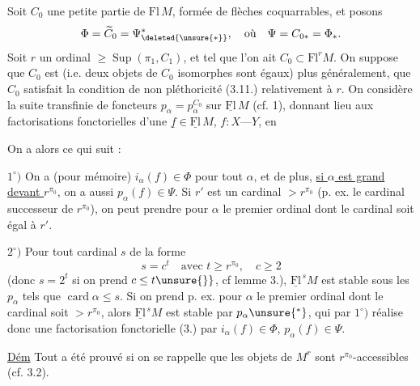 Soit $C_0$ une petite partie de $\mathrm{Fl}\,M$, formée de
flèches coquarrables, et posons
\[
\Phi=\widetilde C_0=\Psi^{*}_{\deleted{\unsure{*}}},\quad\text{où}\quad\Psi=C_{0*}=\Phi_*.
\]
Soit $r$ un ordinal $\geq\operatorname{Sup}(\pi_1,C_1)$, et tel que l'on
ait $C_0\subset\mathrm{Fl}^rM$. On suppose que $C_0$ est 
(i.e. deux objets de $C_0$ isomorphes sont égaux)
plus généralement, que $C_0$ satisfait la 
condition de non pléthoricité (3.11.) relativement à $r$.
On considère la suite transfinie de foncteurs
$p_\alpha=p_\alpha^{C_0}$ sur $\underline{\mathrm{Fl}}\,M$ (cf.  1),  
 donnant lieu aux factorisations
fonctorielles d'une $\underline f\in\underline{\mathrm{Fl}}\,M$, $f:X\text{---}Y$, en

On a alors ce qui suit :

$1^\circ)$ On a (pour mémoire) $i_\alpha(f)\in\Phi$ pour tout $\alpha$, et
de plus, \uline{si $\alpha$ est grand devant $r^{\pi_0}$}, on a aussi
$p_\alpha(f)\in\Psi$. Si $r'$ est un cardinal $>r^{\pi_0}$ (p. ex. le
 cardinal successeur de $r^{\pi_0}$), on peut prendre
pour $\alpha$ le premier ordinal dont le cardinal soit égal
à $r'$.

$2^\circ)$  Pour
tout cardinal $s$ de la forme
\[
s=c^t\quad\text{avec }t\geq r^{\pi_0},\quad c\geq2
\]
(donc $s=2^t$ si on prend $c\leq t\unsure{\}}$, cf lemme 3.), $\underline{\mathrm{Fl}}^{\,s}M$
est stable sous les $p_\alpha$ tels que $\operatorname{card}\alpha\leq s$. Si on
prend p. ex. pour $\alpha$ le premier ordinal dont le
cardinal soit $>r^{\pi_0}$, alors $\underline{\mathrm{Fl}}^{\,s}M$ est stable par
$p_\alpha\unsure{{}^{*}}$, qui par $1^\circ)$ réalise donc une factorisation fonctorielle
(3.) par $i_\alpha(f)\in\Phi$, $p_\alpha(f)\in\Psi$.

\uline{Dém} Tout a été prouvé\unsure{,|\}} si on se rappelle que les
objets de $M^r$ sont $r^{\pi_0}$-accessibles (cf. 3.2).


